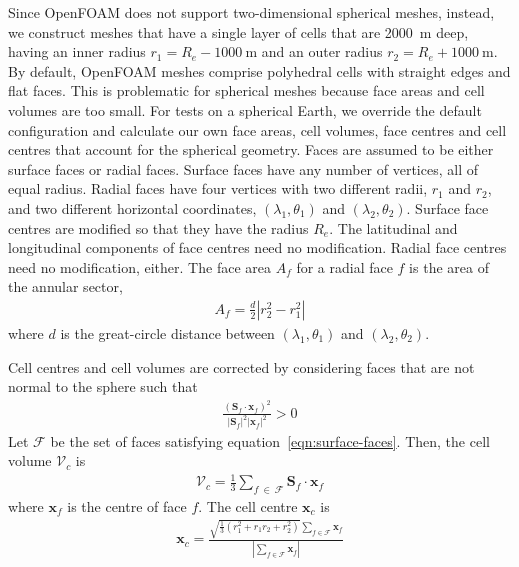 Since OpenFOAM does not support two-dimensional spherical meshes, instead, we construct meshes that have a single layer of cells that are \SI{2000}{\meter} deep, having an inner radius $r_1 = R_e - \SI{1000}{\meter}$ and an outer radius $r_2 = R_e + \SI{1000}{\meter}$.
By default, OpenFOAM meshes comprise polyhedral cells with straight edges and flat faces.  This is problematic for spherical meshes because face areas and cell volumes are too small.
For tests on a spherical Earth, we override the default configuration and calculate our own face areas, cell volumes, face centres and cell centres that account for the spherical geometry.  
Faces are assumed to be either surface faces or radial faces.  Surface faces have any number of vertices, all of equal radius.  Radial faces have four vertices with two different radii, $r_1$ and $r_2$, and two different horizontal coordinates, $(\lambda_1, \theta_1)$ and $(\lambda_2, \theta_2)$.
Surface face centres are modified so that they have the radius $R_e$.  The latitudinal and longitudinal components of face centres need no modification.  Radial face centres need no modification, either.
The face area $A_f$ for a radial face $f$ is the area of the annular sector,
\begin{align}
	A_f = \frac{d}{2} \left\lvert r_2^2 - r_1^2 \right\rvert
\end{align}
where $d$ is the great-circle distance between $(\lambda_1, \theta_1)$ and $(\lambda_2, \theta_2)$.

Cell centres and cell volumes are corrected by considering faces that are not normal to the sphere such that
\begin{align}
	\frac{\left(\mathbf{S}_f \cdot \mathbf{x}_f\right)^2}{\left\lvert \mathbf{S}_f \right\rvert^2 \left\lvert \mathbf{x}_f \right\rvert^2} > 0 \label{eqn:surface-faces}
\end{align}
Let $\mathcal{F}$ be the set of faces satisfying equation~\eqref{eqn:surface-faces}.  Then, the cell volume $\mathcal{V}_c$ is
\begin{align}
	\mathcal{V}_c = \frac{1}{3} \sum_{f\:\in\:\mathcal{F}} \mathbf{S}_f \cdot \mathbf{x}_f
\end{align}
where $\mathbf{x}_f$ is the centre of face $f$.
The cell centre $\mathbf{x}_c$ is
\begin{align}
	\mathbf{x}_c = \frac{\sqrt{\frac{1}{3} \left(r_1^2 + r_1 r_2 + r_2^2\right)}\sum_{f\in\mathcal{F}} \mathbf{x}_f}{\left\lvert \sum_{f\in\mathcal{F}} \mathbf{x}_f \right\rvert}
\end{align}

